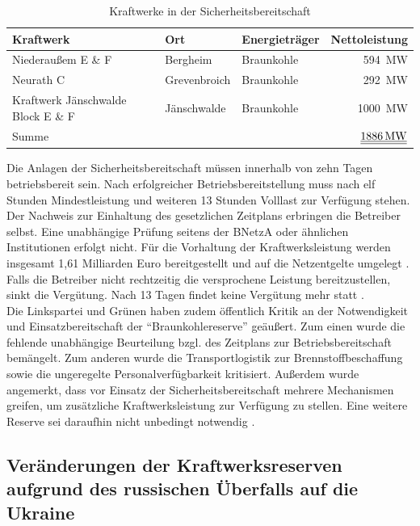 			\begin{table}[H]
				\centering
				\caption{Kraftwerke in der Sicherheitsbereitschaft \cite{Excel_Kraftwerksliste}}
				\label{Tab. Kraftwerke Sicherheitsbereitschaft}
				\begin{tabular}{lllr}
					\hline
					Kraftwerk & Ort & Energieträger & Nettoleistung \\ \hline
					Niederaußem E \& F & Bergheim & Braunkohle & \SI{594}{\mega\watt} \\
					Neurath C & Grevenbroich & Braunkohle & \SI{292 }{\mega\watt} \\
					Kraftwerk Jänschwalde Block E \& F & Jänschwalde & Braunkohle & \SI{1000}{\mega\watt} \\ \hline
					Summe &  &  & $\underline{\underline{\SI{1886}{\mega\watt}}}$ \\ \hline
				\end{tabular}
			\end{table}
		
			Die Anlagen der Sicherheitsbereitschaft müssen innerhalb von zehn Tagen betriebsbereit sein.
			Nach erfolgreicher Betriebsbereitstellung muss nach elf Stunden Mindestleistung und weiteren 13 Stunden Volllast zur Verfügung stehen.
			Der Nachweis zur Einhaltung des gesetzlichen Zeitplans erbringen die Betreiber selbst.
			Eine unabhängige Prüfung seitens der BNetzA oder ähnlichen Institutionen erfolgt nicht.  
			Für die Vorhaltung der Kraftwerksleistung werden insgesamt 1,61 Milliarden Euro bereitgestellt und auf die Netzentgelte umgelegt \cite{Netz_Kapa_Reserve_NextKraftwerke}.
			Falls die Betreiber nicht rechtzeitig die versprochene Leistung bereitzustellen, sinkt die Vergütung.
			Nach 13 Tagen findet keine Vergütung mehr statt \cite{EnWG}. \\
			
			Die Linkspartei und Grünen haben zudem öffentlich Kritik an der Notwendigkeit und Einsatzbereitschaft der "`Braunkohlereserve"' geäußert.
			Zum einen wurde die fehlende unabhängige Beurteilung bzgl. des Zeitplans zur Betriebsbereitschaft bemängelt.
			Zum anderen wurde die Transportlogistik zur Brennstoffbeschaffung sowie die ungeregelte Personalverfügbarkeit kritisiert.
			Außerdem wurde angemerkt, dass vor Einsatz der Sicherheitsbereitschaft mehrere Mechanismen greifen, um zusätzliche Kraftwerksleistung zur Verfügung zu stellen.
			Eine weitere Reserve sei daraufhin nicht unbedingt notwendig \cite{Netz_Kapa_Reserve_NextKraftwerke}.
			
		
	\subsection{Veränderungen der Kraftwerksreserven aufgrund des russischen Überfalls auf die Ukraine}
	
